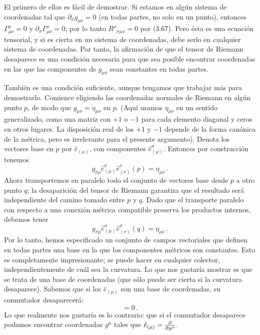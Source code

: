 \documentclass[11pt,b5paper,openany,twoside]{book}
\newcommand{\mn}{{\mu\nu}}
\newcommand{\e}[1]{\hat{e}_{(#1)}}
\newcommand{\p}[1]{{\partial_{#1}}}
\begin{document}
El primero de ellos es fácil de demostrar.
Si estamos en algún sistema de coordenadas tal que $\p\sigma g_\mn=0$ (en todas partes, no solo en un punto), entonces $\Gamma^\rho_\mn = 0$ y $\p\sigma\Gamma^\rho_\mn = 0$; por lo tanto $R^\rho{}_{\sigma\mn}=0$ por (3.67).
Pero ésta es una ecuación tensorial, y si es cierta en un sistema de coordenadas, debe serlo en cualquier sistema de coordenadas.
Por tanto, la afirmación de que el tensor de Riemann desaparece es una condición necesaria para que sea posible encontrar coordenadas en las que las componentes de $g_\mn$ sean constantes en todas partes.

También es una condición suficiente, aunque tengamos que trabajar más para demostrarlo.
Comience eligiendo las coordenadas normales de Riemann en algún punto $p$, de modo que $g_\mn = \eta_\mn$ en $p$.
(Aquí usamos $\eta_\mn$ en un sentido generalizado, como una matriz con $+1$ o $-1$ para cada elemento diagonal y ceros en otros lugares.
La disposición real de los $+1$ y $-1$ depende de la forma canónica de la métrica, pero es irrelevante para el presente argumento).
Denota los vectores base en $p$ por $\e\mu$, con componentes $\e\mu^\sigma$.
Entonces por construcción tenemos
\begin{equation}
g_{\sigma\rho}\e\mu^\sigma \e\nu^\rho (p) =\eta_\mn\,.\label{3.72}
\end{equation}
Ahora transportemos en paralelo todo el conjunto de vectores base desde $p$ a otro punto $q$; la desaparición del tensor de Riemann garantiza que el resultado será independiente del camino tomado entre $p$ y $q$.
Dado que el transporte paralelo con respecto a una conexión métrica compatible preserva los productos internos, debemos tener
\begin{equation}
g_{\sigma\rho}\e\mu^\sigma \e\nu^\rho (q) =\eta_\mn\,.\label{3.73}
\end{equation}
Por lo tanto, hemos especificado un conjunto de campos vectoriales que definen en todas partes una base en la que los componentes métricos son constantes.
Esto es completamente impresionante; se puede hacer en cualquier colector, independientemente de cuál sea la curvatura.
Lo que nos gustaría mostrar es que se trata de una base de coordenadas (que sólo puede ser cierta si la curvatura desaparece).
Sabemos que si los $\e\mu$ son una base de coordenadas, su conmutador desaparecerá:
\begin{equation}
[\e\mu,\e\nu] = 0\,.\label{3.74}
\end{equation}
Lo que realmente nos gustaría es lo contrario: que si el conmutador desaparece podamos encontrar coordenadas $y^\mu$ tales que $\e\mu = {{\partial} \over{\partial y^\mu}}$.
\end{document}
